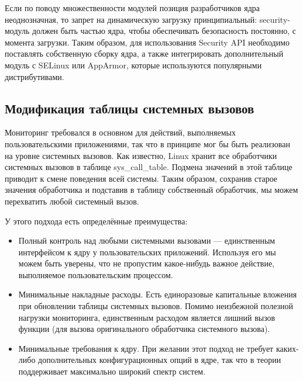 Если по поводу множественности модулей позиция разработчиков ядра неоднозначная, то запрет на динамическую загрузку принципиальный: security-модуль должен быть частью ядра, чтобы обеспечивать безопасность постоянно, с момента загрузки. Таким образом, для использования Security API необходимо поставлять собственную сборку ядра, а также интегрировать дополнительный модуль с SELinux или AppArmor, которые используются популярными дистрибутивами.

\subsection{Модификация таблицы системных вызовов}
Мониторинг требовался в основном для действий, выполняемых пользовательскими приложениями, так что в принципе мог бы быть реализован на уровне системных вызовов. Как известно, Linux хранит все обработчики системных вызовов в таблице sys\_call\_table. Подмена значений в этой таблице приводит к смене поведения всей системы. Таким образом, сохранив старое значения обработчика и подставив в таблицу собственный обработчик, мы можем перехватить любой системный вызов.

У этого подхода есть определённые преимущества:
\begin{itemize}
	\item Полный контроль над любыми системными вызовами — единственным интерфейсом к ядру у пользовательских приложений. Используя его мы можем быть уверены, что не пропустим какое-нибудь важное действие, выполняемое пользовательским процессом.
	\item Минимальные накладные расходы. Есть единоразовые капитальные вложения при обновлении таблицы системных вызовов. Помимо неизбежной полезной нагрузки мониторинга, единственным расходом является лишний вызов функции (для вызова оригинального обработчика системного вызова).
	\item Минимальные требования к ядру. При желании этот подход не требует каких-либо дополнительных конфигурационных опций в ядре, так что в теории поддерживает максимально широкий спектр систем.
\end{itemize}

